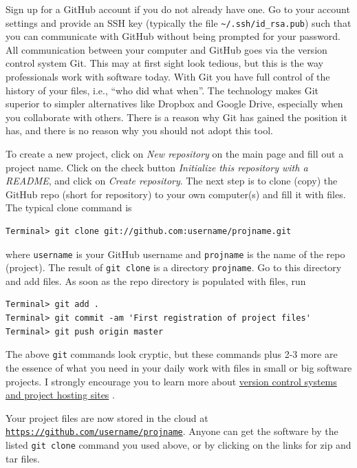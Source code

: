 \documentclass[%
oneside,                 %
final,                   %
10pt]{article}
\begin{document}
Sign up for a GitHub account if you do not already have one.
Go to your account settings and provide an SSH key (typically
the file \Verb!~/.ssh/id_rsa.pub!) such that
you can communicate with GitHub without being prompted for your password.
All communication between your computer and GitHub goes via the version
control system Git. This may at first sight look tedious, but
this is the way professionals work with software today. With Git you
have full control of the history of your files, i.e., ``who did what when''.
The technology makes Git superior to simpler alternatives
like Dropbox and Google Drive,
especially when you collaborate with others.
There is a reason why Git has gained the position it has,
and there is no reason why you should not adopt this tool.

To create a new project, click on \emph{New repository} on the main page and
fill out a project name. Click on the check button \emph{Initialize this
repository with a README}, and click on \emph{Create repository}. The next
step is to clone (copy) the GitHub repo (short for repository) to
your own computer(s) and fill it with files. The typical clone command is

\begin{Verbatim}[frame=lines,label=\fbox{{\tiny Terminal}},framesep=2.5mm,framerule=0.7pt,fontsize=\fontsize{9pt}{9pt}]
Terminal> git clone git://github.com:username/projname.git
\end{Verbatim}
where \texttt{username} is your GitHub username and \texttt{projname} is the
name of the repo (project). The result of \texttt{git clone} is a
directory \texttt{projname}. Go to this directory and add files.
As soon as the repo directory is populated with files, run

\begin{Verbatim}[frame=lines,label=\fbox{{\tiny Terminal}},framesep=2.5mm,framerule=0.7pt,fontsize=\fontsize{9pt}{9pt}]
Terminal> git add .
Terminal> git commit -am 'First registration of project files'
Terminal> git push origin master
\end{Verbatim}
The above \texttt{git} commands look cryptic, but these commands plus
2-3 more are the essence of what you need in your daily work with
files in small or big
software projects. I strongly encourage you to
learn more about \href{{http://hplgit.github.io/teamods/bitgit/html/}}{version control systems and project hosting
sites}
\cite{Langtangen_bitgit}.

Your project files are now stored in the cloud at
\href{{https://github.com/username/projname}}{\nolinkurl{https://github.com/username/projname}}. Anyone can
get the software by the listed \texttt{git clone} command you used above,
or by clicking on the links for zip and tar files.
\end{document}
